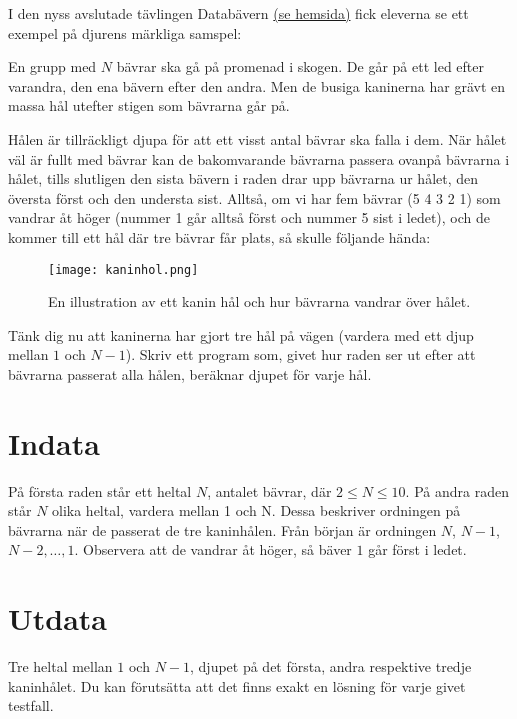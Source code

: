 
I den nyss avslutade tävlingen Databävern \href{www.databavern.se}{(se hemsida)} fick
eleverna se ett exempel på djurens märkliga samspel:

En grupp med $N$ bävrar ska gå på promenad i skogen. De går på ett led efter
varandra, den ena bävern efter den andra. Men de busiga kaninerna har grävt en
massa hål utefter stigen som bävrarna går på.

Hålen är tillräckligt djupa för att ett visst antal bävrar ska falla i dem. När
hålet väl är fullt med bävrar kan de bakomvarande bävrarna passera ovanpå
bävrarna i hålet, tills slutligen den sista bävern i raden drar upp bävrarna ur
hålet, den översta först och den understa sist. Alltså, om vi har fem bävrar (5
4 3 2 1) som vandrar åt höger (nummer 1 går alltså först och nummer 5 sist i
ledet), och de kommer till ett hål där tre bävrar får plats, så skulle följande
hända:

\begin{figure}[ht!]
\centering
\texttt{[image: kaninhol.png]}
\caption{En illustration av ett kanin hål och hur bävrarna vandrar över hålet.}
\label{overflow}
\end{figure}

Tänk dig nu att kaninerna har gjort tre hål på vägen (vardera med ett djup
mellan $1$ och $N-1$). Skriv ett program som, givet hur raden ser ut efter att
bävrarna passerat alla hålen, beräknar djupet för varje hål.

\section*{Indata}

På första raden står ett heltal $N$, antalet bävrar, där $2 \leq N \leq 10$. På andra raden
står $N$ olika heltal, vardera mellan 1 och N. Dessa beskriver ordningen på
bävrarna när de passerat de tre kaninhålen. Från början är ordningen $N$, $N-1$,
$N-2,\ldots,1$. Observera att de vandrar åt höger, så bäver $1$ går först i ledet.

\section*{Utdata}

Tre heltal mellan $1$ och $N-1$, djupet på det första, andra respektive tredje
kaninhålet. Du kan förutsätta att det finns exakt en lösning för varje givet
testfall.
